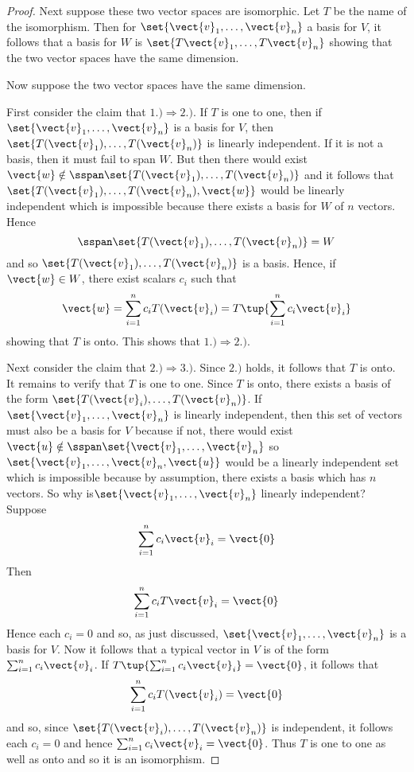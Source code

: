 \begin{proof}
Next suppose these two vector spaces are isomorphic. Let $T$ be the name of
the isomorphism. Then for $\set{\vect{v}_{1},\ldots,\vect{v}_{n}} $
a basis for $V$, it follows that a basis for $W$
is $\set{T\vect{v}_{1},\ldots,T\vect{v}_{n}} $ showing that the two
vector spaces have the same dimension.

Now suppose the two vector spaces have the same dimension.

First consider the claim that $1.)\Rightarrow 2.)$. If $T$ is one to one,
then if $\set{\vect{v}_{1},\ldots,\vect{v}
_{n}} $ is a basis for $V$, then $\set{T(\vect{v}_{1}),\ldots,T(\vect{v
}_{n})} $ is linearly independent. If it is not a basis, then it must
fail to span $W$. But then there would exist $\vect{w}\notin \sspan
\set{T(\vect{v}_{1}),\ldots,T(\vect{v}_{n})} $ and it follows that $
\set{T(\vect{v}_{1}),\ldots,T(\vect{v}_{n}),\vect{w}} $ would be
linearly independent which is impossible because there exists a basis for $W$
of $n$ vectors. Hence 
\[
\sspan\set{T(\vect{v}_{1}),\ldots,T(\vect{v}
_{n})} =W
\]
and so $\set{T(\vect{v}_{1}),\ldots,T(\vect{v}_{n})} $
is a basis. Hence, if $\vect{w}\in W$, there exist scalars $c_{i}$ such that 
\begin{equation*}
\vect{w}=\sum_{i=1}^{n}c_{i}T(\vect{v}_{i})=T\tup{\sum_{i=1}^{n}c_{i}\vect{v}
_{i}}
\end{equation*}
showing that $T$ is onto. This shows that $1.)\Rightarrow 2.)$.

Next consider the claim that $2.)\Rightarrow 3.)$. Since $2.)$ holds, it
follows that $T$ is onto. It remains to verify that $T$ is one to one. Since 
$T$ is onto, there exists a basis of the form $\set{T(\vect{v}_{i}),\ldots,T
(\vect{v}_{n})}$. If $\set{\vect{v}_{1},\ldots,\vect{v}_{n}} $
is linearly independent, then this set of vectors must also be a basis for $
V $ because if not, there would exist $\vect{u}\notin \sspan\set{\vect{
v}_{1},\ldots,\vect{v}_{n}} $ so $\set{\vect{v}_{1},\ldots,\vect{v}
_{n},\vect{u}} $ would be a linearly independent set which is
impossible because by assumption, there exists a basis which has $n$
vectors. So why is$\set{\vect{v}_{1},\ldots,\vect{v}_{n}} $
linearly independent? Suppose 
\begin{equation*}
\sum_{i=1}^{n}c_{i}\vect{v}_{i}=\vect{0}
\end{equation*}
Then
\begin{equation*}
\sum_{i=1}^{n}c_{i}T\vect{v}_{i}=\vect{0}
\end{equation*}
Hence each $c_{i}=0$ and so, as just discussed, $\set{\vect{v}_{1},\ldots,
\vect{v}_{n}} $ is a basis for $V$. Now it follows that a typical
vector in $V$ is of the form $\sum_{i=1}^{n}c_{i}\vect{v}_{i}$. If $T\tup{
\sum_{i=1}^{n}c_{i}\vect{v}_{i}} =\vect{0}$, it follows that 
\begin{equation*}
\sum_{i=1}^{n}c_{i}T(\vect{v}_{i})=\vect{0}
\end{equation*}
and so, since $\set{T(\vect{v}_{i}),\ldots,T(\vect{v}_{n})} $ is
independent, it follows each $c_{i}=0$ and hence $\sum_{i=1}^{n}c_{i}\vect{v}
_{i}=\vect{0}$. Thus $T$ is one to one as well as onto and so it is an
isomorphism.


\end{proof}
